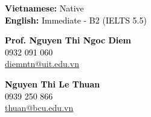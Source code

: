 \documentclass[10pt,a4paper,ragged2e,withhyper]{altacv}
\begin{document}
\begin{paracol}{2}
            \textcolor{black}{\textbf{Vietnamese:}}  \textcolor{black}{Native} \\
            \vspace{0.8em}
            \textcolor{black}{\textbf{English:}}  \textcolor{black}{Immediate - B2 (IELTS 5.5)}
            
            \textcolor{black}{\textbf{Prof. Nguyen Thi Ngoc Diem}} \\
            \vspace{0.5em}
            \textcolor{blue}{}  \textcolor{black}{0932 091 060} \\
            \vspace{0.5em}
            \textcolor{blue}{} \textcolor{black}{\href{mailto:diemntn@uit.edu.vn}{diemntn@uit.edu.vn}} \\
            \vspace{2em}
            
            \textcolor{black}{\textbf{Nguyen Thi Le Thuan}} \\
            \vspace{0.5em}
            \textcolor{blue}{}  \textcolor{black}{0939 250 866} \\
            \vspace{0.5em}
            \textcolor{blue}{} \textcolor{black}{\href{mailto:thuan@bcu.edu.vn}{thuan@bcu.edu.vn}} \\
            \vspace{0.8em}
        
        
        
        

\end{paracol}
\end{document}
